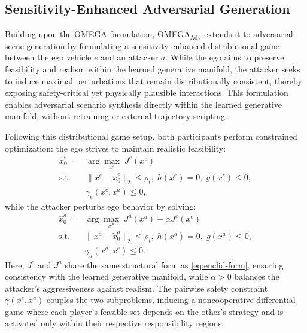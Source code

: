 \documentclass[10pt,twocolumn,letterpaper]{article}
\theoremstyle{plain}
\theoremstyle{remark}
\begin{document}
\subsection{Sensitivity-Enhanced Adversarial Generation}
\label{sec:omega_se}

Building upon the OMEGA formulation, OMEGA$_\mathrm{Adv}$ extends it to adversarial scene generation by formulating a sensitivity-enhanced distributional game between the ego vehicle \(e\) and an attacker \(a\). While the ego aims to preserve feasibility and realism within the learned generative manifold, the attacker seeks to induce maximal perturbations that remain distributionally consistent, thereby exposing safety-critical yet physically plausible interactions. This formulation enables adversarial scenario synthesis directly within the learned generative manifold, without retraining or external trajectory scripting.

Following this distributional game setup, both participants perform constrained optimization: the ego strives to maintain realistic feasibility:
\begin{equation}
\begin{aligned}
\hat{x}_0^e = 
&\arg\max_{x^e} \; J^e(x^e) \\
\text{s.t.}\quad
&\|x^e - \tilde{x}_0^e\|_2 \le \rho_t, \;
h(x^e)=0,\; g(x^e)\le0, \\
&\gamma_e(x^e,x^a)\le 0,
\end{aligned}
\label{eq:ego_opt}
\end{equation}
while the attacker perturbs ego behavior by solving:
\begin{equation}
\begin{aligned}
\hat{x}_0^a =
&\arg\max_{x^a} \; J^a(x^a) - \alpha J^e(x^e) \\
\text{s.t.}\quad
&\|x^a - \tilde{x}_0^a\|_2 \le \rho_t, \;
h(x^a)=0,\; g(x^a)\le0, \\
&\gamma_a(x^a,x^e)\le 0.
\end{aligned}
\label{eq:attacker_opt}
\end{equation}
Here, \(J^e\) and \(J^a\) share the same structural form as \cref{eq:euclid-form}, 
ensuring consistency with the learned generative manifold, 
while \(\alpha>0\) balances the attacker’s aggressiveness against realism. 
The pairwise safety constraint \(\gamma(x^e,x^a)\) couples the two subproblems, 
inducing a noncooperative differential game where each player’s feasible set depends on the other’s strategy and is activated only within their respective responsibility regions.
\end{document}
